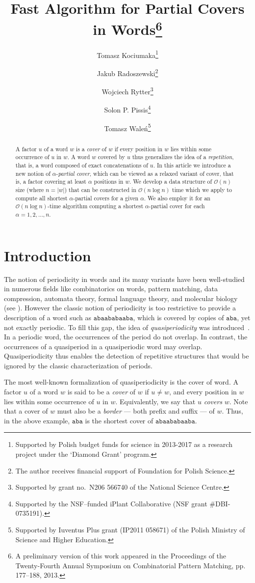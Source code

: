 \documentclass{article}
\title{
    Fast Algorithm for Partial Covers in Words\footnote{
      A preliminary version of this work appeared in the Proceedings of
      the Twenty-Fourth Annual Symposium on Combinatorial Pattern Matching, pp. 177--188, 2013.
    }
  }
\date{}
\author[1]{Tomasz Kociumaka\thanks{
    Supported by Polish budget funds for science in 2013-2017 as a research project under the `Diamond Grant' program.
    }}
\author[1]{Jakub Radoszewski\thanks{The author receives financial support of Foundation for Polish Science.}}
\author[1,2]{Wojciech Rytter\thanks{Supported by grant no.\ N206 566740 of the National Science Centre.}}
\author[3]{Solon P. Pissis\thanks{Supported by the NSF--funded iPlant Collaborative (NSF grant \#DBI-0735191).}}
\author[1]{Tomasz Wale\'n\thanks{Supported by Iuventus Plus grant (IP2011 058671) of the Polish Ministry of Science and Higher Education.}}
\affil[1]{Faculty of Mathematics, Informatics and Mechanics, University of Warsaw, Poland, \texttt{[kociumaka, jrad, rytter, walen]@mimuw.edu.pl}}
\affil[2]{Faculty of Mathematics and Computer Science, Copernicus University, Toru\'n, Poland}
\affil[3]{Department of Informatics, King's College London, UK, \texttt{solon.pissis@h-its.org}}
\theoremstyle{theorem}
\theoremstyle{definition}
\newcommand{\Oh}{\mathcal{O}}
\begin{document}
\maketitle
  \begin{abstract}
    A factor $u$ of a word $w$ is a \emph{cover} of $w$ if every position in $w$ lies within some occurrence of $u$ in $w$.
    A word $w$ covered by $u$ thus generalizes the
    idea of a \emph{repetition}, that is, a word composed of exact concatenations of $u$.
    In this article we introduce a new notion of
    $\alpha$-\emph{partial cover}, which can be viewed as a relaxed variant
    of cover, that is, a factor covering at least $\alpha$ positions in $w$.
    We develop a data structure of $\Oh(n)$ size (where $n=|w|$) that can be constructed in $\Oh(n\log n)$ time
    which we apply to compute all shortest $\alpha$-partial covers for a given $\alpha$.
    We also employ it for an $\Oh(n\log n)$-time algorithm computing a shortest $\alpha$-partial cover
    for each $\alpha=1,2,\ldots,n$.
  \end{abstract}



    \section{Introduction}
    The notion of periodicity in words and its many variants have been well-studied in numerous
    fields like combinatorics on words, pattern matching, data compression, automata theory,
    formal language theory, and molecular biology (see \cite{DBLP:journals/tcs/CrochemoreIR09}).
    However the classic notion of
    periodicity is too restrictive to provide a description of a word such as
    $\texttt{abaababaaba}$, which is covered by copies of $\texttt{aba}$, yet not exactly periodic.
    To fill this gap, the idea of \emph{quasiperiodicity} was introduced~\cite{Apo93}.
    In a periodic word, the occurrences of the period do not overlap. In contrast,
    the occurrences of a quasiperiod in a quasiperiodic word may overlap.
    Quasiperiodicity thus enables the
    detection of repetitive structures that would be ignored by the classic characterization
    of periods.

    The most well-known formalization of quasiperiodicity is the cover of word.
    A factor $u$ of a word $w$ is said to be
    a \emph{cover} of $w$ if $u\ne w$, and every position in $w$ lies within
    some occurrence of $u$ in $w$.
    Equivalently, we say that $u$ \emph{covers} $w$. Note that a cover of $w$ must also be
    a \emph{border} --- both prefix and suffix --- of $w$.
    Thus, in the above example, $\texttt{aba}$ is the shortest cover of $\texttt{abaababaaba}$.
\end{document}
